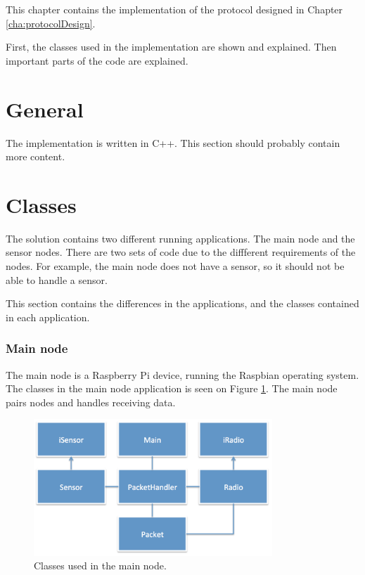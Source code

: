 This chapter contains the implementation of the protocol designed in Chapter \ref{cha:protocolDesign}. 

First, the classes used in the implementation are shown and explained. Then important parts of the code are explained.
 

\section{General}
The implementation is written in C++. This section should probably contain more content.

\section{Classes}
The solution contains two different running applications. The main node and the sensor nodes. There are two sets of code due to the diffferent requirements of the nodes. For example, the main node does not have a sensor, so it should not be able to handle a sensor.

This section contains the differences in the applications, and the classes contained in each application.

\subsubsection*{Main node}
The main node is a Raspberry Pi device, running the Raspbian operating system. The classes in the main node application is seen on Figure \ref{fig:mainnodeClass}.
The main node pairs nodes and handles receiving data.

\begin{figure}[h!]
\centering
\includegraphics[width=0.8\textwidth]{chapters/implementation/figures/mainnodeClass.png}
\caption{Classes used in the main node.}
\label{fig:mainnodeClass}
\end{figure}




